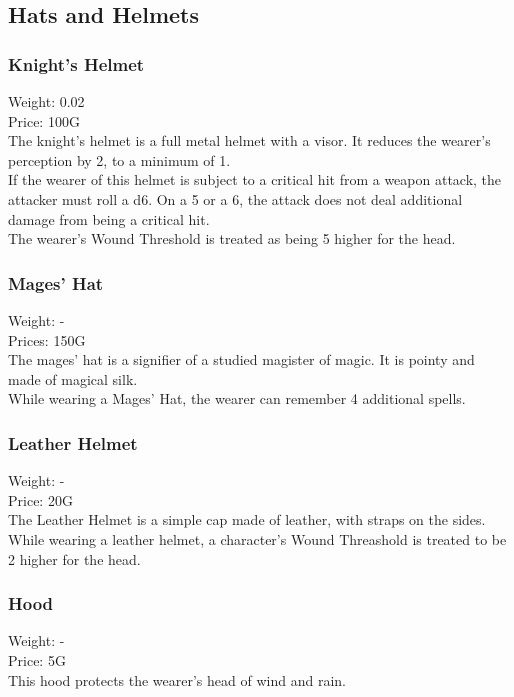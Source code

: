 \subsection{Hats and Helmets}

\subsubsection{Knight's Helmet}
Weight: 0.02\\
Price: 100G\\
The knight's helmet is a full metal helmet with a visor. It reduces the wearer's perception by 2, to a minimum of 1.\\
If the wearer of this helmet is subject to a critical hit from a weapon attack, the attacker must roll a d6. On a 5 or a 6, the attack does not deal additional damage from being a critical hit.\\
The wearer's Wound Threshold is treated as being 5 higher for the head.\\

\subsubsection{Mages' Hat}
Weight: -\\
Prices: 150G\\
The mages' hat is a signifier of a studied magister of magic. It is pointy and made of magical silk.\\
While wearing a Mages' Hat, the wearer can remember 4 additional spells.\\

\subsubsection{Leather Helmet}
Weight: -\\
Price: 20G\\
The Leather Helmet is a simple cap made of leather, with straps on the sides.\\
While wearing a leather helmet, a character's Wound Threashold is treated to be 2 higher for the head.\\

\subsubsection{Hood}
Weight: -\\
Price: 5G\\
This hood protects the wearer's head of wind and rain.\\

